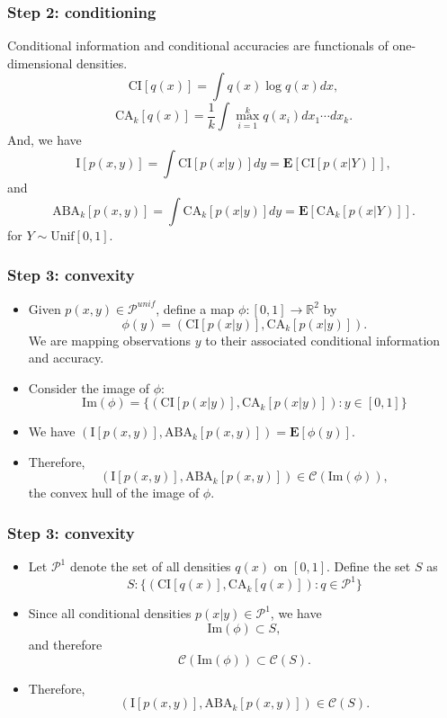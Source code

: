 \documentclass{beamer}
\newcommand{\E}{\textbf{E}}
\begin{document}
\begin{frame}
\frametitle{Step 2: conditioning}
Conditional information and conditional accuracies are functionals of one-dimensional densities.
\[
\text{CI}[q(x)] = \int q(x) \log q(x) dx,
\]
\[
\text{CA}_k[q(x)] = \frac{1}{k}\int \max_{i=1}^k q(x_i) dx_1 \cdots dx_k.
\]
And, we have
\[
\text{I}[p(x, y)] = \int \text{CI}[p(x|y)]dy = \E[\text{CI}[p(x|Y)]],
\]
and
\[
\text{ABA}_k[p(x, y)] = \int \text{CA}_k[p(x|y)]dy = \E[\text{CA}_k[p(x|Y)]].
\]
for $Y \sim \text{Unif}[0,1]$.
\end{frame}

\begin{frame}
\frametitle{Step 3: convexity}
\begin{itemize}
\item Given $p(x, y) \in \mathcal{P}^{unif}$, define a map $\phi: [0,1] \to \mathbb{R}^2$
by
\[
\phi(y) = (\text{CI}[p(x|y)], \text{CA}_k[p(x|y)]).
\]
We are mapping observations $y$ to their associated conditional information and accuracy.
\item Consider the image of $\phi$:
\[
\text{Im}(\phi) = \{(\text{CI}[p(x|y)], \text{CA}_k[p(x|y)]): y \in [0,1]\}
\]
\item We have $(\text{I}[p(x, y)], \text{ABA}_k[p(x, y)]) = \E[\phi(y)]$.
\item Therefore,
\[
(\text{I}[p(x, y)], \text{ABA}_k[p(x, y)]) \in \mathcal{C}(\text{Im}(\phi)),
\]
the convex hull of the image of $\phi$.
\end{itemize}
\end{frame}

\begin{frame}
\frametitle{Step 3: convexity}
\begin{itemize}
\item Let $\mathcal{P}^1$ denote the set of all densities $q(x)$ on $[0,1]$. Define the set $S$ as
\[
S: \{(\text{CI}[q(x)], \text{CA}_k[q(x)]): q \in \mathcal{P}^1\}
\]
\item Since all conditional densities $p(x|y) \in \mathcal{P}^1$, we have
\[
\text{Im}(\phi) \subset S,
\]
and therefore
\[
\mathcal{C}(\text{Im}(\phi)) \subset \mathcal{C}(S).
\]
\item Therefore,
\[
(\text{I}[p(x, y)], \text{ABA}_k[p(x, y)]) \in \mathcal{C}(S).
\]
\end{itemize}
\end{frame}
\end{document}
